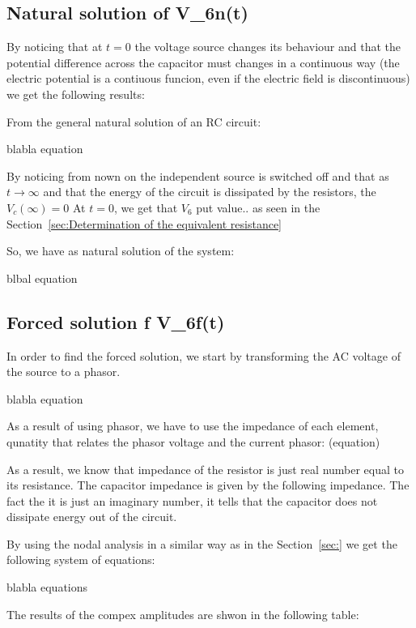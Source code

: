 
\subsection{Natural solution of V_{6n}(t)}

By noticing that at $t = 0$ the voltage source changes its behaviour and that the potential difference across the capacitor must changes in a continuous way (the electric potential is a contiuous funcion, even  if the electric field is discontinuous)
we get the following results:

From the general natural solution of an RC circuit:

blabla equation

By noticing from nown on the independent source is switched off and that as $t \rightarrow \infty$ and that the energy of the circuit is dissipated by the resistors, the $V_c(\infty) = 0$
At $t = 0$, we get that $V_6$ put value.. as seen in the Section~\ref{sec:Determination of the equivalent resistance}

So, we have as natural solution of the system:

blbal equation


\subsection{Forced solution f V_{6f}(t)}

In order to find the forced solution, we start by transforming the AC voltage of the source to a phasor.

blabla equation

As a result of using phasor, we have to use the impedance of each element, qunatity that relates the phasor voltage and the current phasor: (equation)

As a result, we know that impedance of the resistor is just real number equal to its resistance. The capacitor impedance is given by the following impedance.
The fact the it is just an imaginary number, it tells that the capacitor does not dissipate energy out of the circuit.


By using the nodal analysis in a similar way as in the Section~\ref{sec:} we get the following system of equations:

blabla equations


The results of the compex amplitudes are shwon in the following table:








